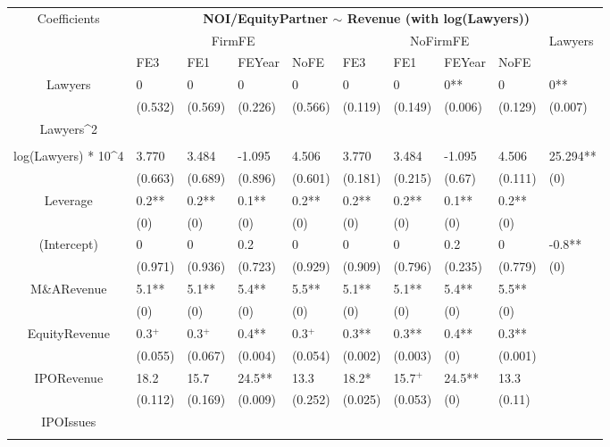 \documentclass{article}
\begin{document}
\begin{table}[H]
\centering
\begin{tabular}{|clllllllll|}
\hline
\multirow{3}{*}{Coefficients} & \multicolumn{9}{c|}{\textbf{NOI/EquityPartner $\sim$ Revenue (with log(Lawyers))}} \\
\cline{2-10}
& \multicolumn{4}{c}{FirmFE} & \multicolumn{4}{c}{NoFirmFE} & \multirow{2}{*}{Lawyers} \\
\cline{2-9}
& FE3 & FE1 & FEYear & NoFE & FE3 & FE1 & FEYear & NoFE &  \\
\hline
 
Lawyers & 0 & 0 & 0 & 0 & 0 & 0 & 0** & 0 & 0** \\ 
   & (0.532) & (0.569) & (0.226) & (0.566) & (0.119) & (0.149) & (0.006) & (0.129) & (0.007) \\ 
  Lawyers^2 &  &  &  &  &  &  &  &  &  \\ 
   &  &  &  &  &  &  &  &  &  \\ 
  log(Lawyers) * 10^4 & 3.770 & 3.484 & -1.095 & 4.506 & 3.770 & 3.484 & -1.095 & 4.506 & 25.294** \\ 
   & (0.663) & (0.689) & (0.896) & (0.601) & (0.181) & (0.215) & (0.67) & (0.111) & (0) \\ 
  Leverage & 0.2** & 0.2** & 0.1** & 0.2** & 0.2** & 0.2** & 0.1** & 0.2** &  \\ 
   & (0) & (0) & (0) & (0) & (0) & (0) & (0) & (0) &  \\ 
  (Intercept) & 0 & 0 & 0.2 & 0 & 0 & 0 & 0.2 & 0 & -0.8** \\ 
   & (0.971) & (0.936) & (0.723) & (0.929) & (0.909) & (0.796) & (0.235) & (0.779) & (0) \\ 
  M\&ARevenue & 5.1** & 5.1** & 5.4** & 5.5** & 5.1** & 5.1** & 5.4** & 5.5** &  \\ 
   & (0) & (0) & (0) & (0) & (0) & (0) & (0) & (0) &  \\ 
  EquityRevenue & 0.3$^{+}$ & 0.3$^{+}$ & 0.4** & 0.3$^{+}$ & 0.3** & 0.3** & 0.4** & 0.3** &  \\ 
   & (0.055) & (0.067) & (0.004) & (0.054) & (0.002) & (0.003) & (0) & (0.001) &  \\ 
  IPORevenue & 18.2 & 15.7 & 24.5** & 13.3 & 18.2* & 15.7$^{+}$ & 24.5** & 13.3 &  \\ 
   & (0.112) & (0.169) & (0.009) & (0.252) & (0.025) & (0.053) & (0) & (0.11) &  \\ 
  IPOIssues &  &  &  &  &  &  &  &  &  \\ 
   &  &  &  &  &  &  &  &  &  \\ 

\end{tabular}
\end{table}
\end{document}
